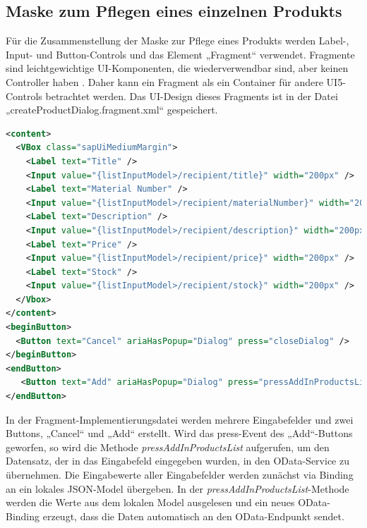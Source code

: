 \subsection{Maske zum Pflegen eines einzelnen Produkts}

Für die Zusammenstellung der Maske zur Pflege eines Produkts werden Label-, Input- und Button-Controls und das Element „Fragment“ verwendet.  Fragmente sind leichtgewichtige UI-Komponenten, die wiederverwendbar sind, aber keinen Controller haben \cite{sud:s16}. Daher kann ein Fragment als ein Container für andere UI5-Controls betrachtet werden. Das UI-Design dieses Fragments ist in der Datei „createProductDialog.fragment.xml“ gespeichert.

\begin{lstlisting}[language=XML]
<content>
  <VBox class="sapUiMediumMargin">
    <Label text="Title" />
    <Input value="{listInputModel>/recipient/title}" width="200px" />
    <Label text="Material Number" />
    <Input value="{listInputModel>/recipient/materialNumber}" width="200px" />
    <Label text="Description" />
    <Input value="{listInputModel>/recipient/description}" width="200px" />
    <Label text="Price" />
    <Input value="{listInputModel>/recipient/price}" width="200px" />
    <Label text="Stock" />
    <Input value="{listInputModel>/recipient/stock}" width="200px" />
  </Vbox>
</content>
<beginButton>
  <Button text="Cancel" ariaHasPopup="Dialog" press="closeDialog" />
</beginButton>
<endButton>
   <Button text="Add" ariaHasPopup="Dialog" press="pressAddInProductsList" />
</endButton>
\end{lstlisting}

In der Fragment-Implementierungsdatei werden mehrere Eingabefelder und zwei Buttons, „Cancel“ und „Add“ erstellt. Wird das press-Event des „Add“-Buttons geworfen, so wird die Methode \textit{pressAddInProductsList} aufgerufen, um den Datensatz, der in das Eingabefeld eingegeben wurden, in den OData-Service zu übernehmen. Die Eingabewerte aller Eingabefelder werden zunächst via Binding an ein lokales JSON-Model übergeben. In der \textit{pressAddInProductsList}-Methode werden die Werte aus dem lokalen Model ausgelesen und ein neues OData-Binding erzeugt, dass die Daten automatisch an den OData-Endpunkt sendet.


